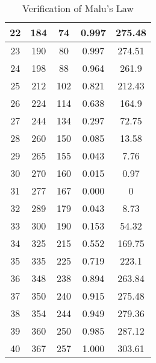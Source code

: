 \begin{table}[H]
{\begin{tabular}{|c|c|c|c|c|}
	22 & 184 & 74   & 0.997 & 275.48 \\ \hline
	23 & 190 & 80   & 0.997 & 274.51 \\ \hline
	24 & 198 & 88   & 0.964 & 261.9  \\ \hline
	25 & 212 & 102  & 0.821 & 212.43 \\ \hline
	26 & 224 & 114  & 0.638 & 164.9  \\ \hline
	27 & 244 & 134  & 0.297 & 72.75  \\ \hline
	28 & 260 & 150  & 0.085 & 13.58  \\ \hline
	29 & 265 & 155  & 0.043 & 7.76   \\ \hline
	30 & 270 & 160  & 0.015 & 0.97   \\ \hline
	31 & 277 & 167  & 0.000 & 0      \\ \hline
	32 & 289 & 179  & 0.043 & 8.73   \\ \hline
	33 & 300 & 190  & 0.153 & 54.32  \\ \hline
	34 & 325 & 215  & 0.552 & 169.75 \\ \hline
	35 & 335 & 225  & 0.719 & 223.1  \\ \hline
	36 & 348 & 238  & 0.894 & 263.84 \\ \hline
	37 & 350 & 240  & 0.915 & 275.48 \\ \hline
	38 & 354 & 244  & 0.949 & 279.36 \\ \hline
	39 & 360 & 250  & 0.985 & 287.12 \\ \hline
	40 & 367 & 257  & 1.000 & 303.61 \\ \hline
	\end{tabular}%
	}
	\caption{Verification of Malu's Law}
	\label{tab:malus_law}
\end{table}